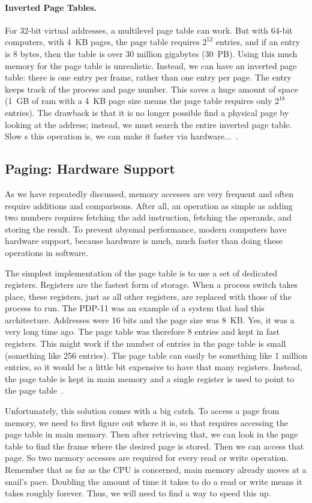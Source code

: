 \paragraph{Inverted Page Tables.} 
For 32-bit virtual addresses, a multilevel page table can work. But with 64-bit computers, with 4~KB pages, the page table requires $2^{52}$ entries, and if an entry is 8 bytes, then the table is over 30 million gigabytes (30~PB). Using this much memory for the page table is unrealistic. Instead, we can have an inverted page table: there is one entry per frame, rather than one entry per page. The entry keeps track of the process and page number. This saves a huge amount of space (1~GB of ram with a 4~KB page size means the page table requires only $2^{18}$ entries). The drawback is that it is no longer possible find a physical page by looking at the address; instead, we must search the entire inverted page table. Slow s this operation is, we can make it faster via hardware...~\cite{mos}.

\subsection*{Paging: Hardware Support}
As we have repeatedly discussed, memory accesses are very frequent and often require additions and comparisons. After all, an operation as simple as adding two numbers requires fetching the add instruction, fetching the operands, and storing the result. To prevent abysmal performance, modern computers have hardware support, because hardware is much, much faster than doing these operations in software.

The simplest implementation of the page table is to use a set of dedicated registers. Registers are the fastest form of storage. When a process switch takes place, these registers, just as all other registers, are replaced with those of the process to run. The PDP-11 was an example of a system that had this architecture. Addresses were 16 bits and the page size was 8~KB. Yes, it was a very long time ago. The page table was therefore 8 entries and kept in fast registers. This might work if the number of entries in the page table is small (something like 256 entries). The page table can easily be something like 1 million entries, so it would be a little bit expensive to have that many registers. Instead, the page table is kept in main memory and a single register is used to point to the page table~\cite{osc}.

Unfortunately, this solution comes with a big catch. To access a page from memory, we need to first figure out where it is, so that requires accessing the page table in main memory. Then after retrieving that, we can look in the page table to find the frame where the desired page is stored. Then we can access that page. So two memory accesses are required for every read or write operation. Remember that as far as the CPU is concerned, main memory already moves at a snail's pace. Doubling the amount of time it takes to do a read or write means it takes roughly forever. Thus, we will need to find a way to speed this up.

